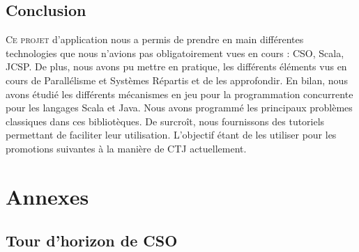 \documentclass[a4paper,11pt,french]{report}
\begin{document}
\chapter{Conclusion}

\lettrine{C}{e projet} d'application nous a permis de prendre en main différentes technologies que nous n'avions pas obligatoirement vues en cours : CSO, Scala, JCSP. De plus, nous avons pu mettre en pratique, les différents éléments vus en cours de Parallélisme et Systèmes Répartis et de les approfondir. En bilan, nous avons étudié les différents mécanismes en jeu pour la programmation concurrente pour les langages Scala et Java. Nous avons programmé les principaux problèmes classiques dans ces bibliotèques. De surcroît, nous fournissons des tutoriels permettant de faciliter leur utilisation. L'objectif étant de les utiliser pour les promotions suivantes à la manière de CTJ actuellement.

\part{Annexes}
\appendix
\chapter{ Tour d'horizon de CSO }
\label{chap:cso}
\end{document}
